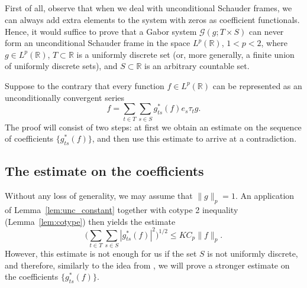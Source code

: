 \documentclass[reqno,a4paper,12pt]{amsart}
\numberwithin{equation}{section}
\numberwithin{figure}{section}
\newcommand\R{\mathbb{R}}
\newcommand\G{\mathcal{G}}
\newcommand\1{\mathds{1}}
\newcommand{\TTT}{T}
\newcommand{\SSS}{S}
\newcommand{\ts}{\tau}
\newcommand{\gtss}{g_{ts}^*}
\renewcommand\le{\leqslant}
\theoremstyle{plain}
\newcommand{\lemref}[1]{Lemma~\ref{#1}}
\theoremstyle{definition}
\begin{document}
\subsection{} 
First of all, observe that when we deal with unconditional Schauder frames, we can always add extra elements to the system with zeros as coefficient functionals. Hence, it would suffice to prove that a Gabor system $\G(g; \TTT\times \SSS)$ can never form an unconditional Schauder frame in the space $L^p(\R)$, $1< p < 2$, where $g\in L^p(\R)$,
$\TTT\subset\R$ is a  uniformly discrete set (or, more generally, a finite union of uniformly discrete sets), and $\SSS\subset\R$ is an arbitrary countable set.

Suppose to the contrary that every function $f\in L^p(\R)$ can be represented as an unconditionally convergent series
\begin{equation}\label{eq:4.1}
f = \sum_{t\in \TTT} \sum_{s\in \SSS} \gtss(f) e_s \ts_t g.
\end{equation}
The proof will consist of two steps: at first we obtain an estimate on the sequence of coefficients $\{\gtss(f)\}$, and then use this estimate to arrive at a contradiction.

\subsection{The estimate on the coefficients}
Without any loss of generality, we may assume that $\|g\|_p=1$. An application of \lemref{lem:unc_constant} together with cotype 2 inequality (\lemref{lem:cotype}) then yields the estimate
\begin{equation}
\Big(\sum_{t\in \TTT} \sum_{s\in \SSS} |g_{ts}^*(f)|^2\Big)^{1/2}\le K C_p  \|f\|_p.
\end{equation}
However, this estimate is not enough for us if the set $\SSS$ is not uniformly discrete, and therefore, similarly to the idea from \cite{LT25a}, we will prove a stronger estimate on the coefficients $\{g_{ts}^*(f)\}$.
\end{document}

